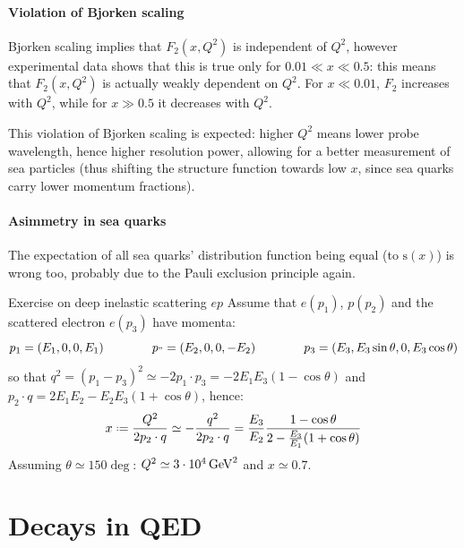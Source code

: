 \paragraph{Violation of Bjorken scaling}

Bjorken scaling implies that $ F_2(x,Q^2) $ is independent of $ Q^2 $, however experimental data shows that this is true only for $ 0.01 \ll x \ll 0.5 $: this means that $ F_2(x,Q^2) $ is actually weakly dependent on $ Q^2 $. For $ x \ll 0.01 $, $ F_2 $ increases with $ Q^2 $, while for $ x \gg 0.5 $ it decreases with $ Q^2 $.

This violation of Bjorken scaling is expected: higher $ Q^2 $ means lower probe wavelength, hence higher resolution power, allowing for a better measurement of sea particles (thus shifting the structure function towards low $ x $, since sea quarks carry lower momentum fractions).

\paragraph{Asimmetry in sea quarks}

The expectation of all sea quarks' distribution function being equal (to $ \text{s}(x) $) is wrong too, probably due to the Pauli exclusion principle again.

\begin{example}{Exercise on deep inelastic scattering $ ep $}{}
  Assume that $ e(p_1) $, $ p(p_2) $ and the scattered electron $ e(p_3) $ have momenta:
  \begin{equation*}
    p_1 = (E_1 , 0 , 0 , E_1)
    \qquad \qquad
    p_" = (E_2 , 0 , 0 , - E_2)
    \qquad \qquad
    p_3 = (E_3 , E_3 \sin \theta , 0 , E_3 \cos \theta)
  \end{equation*}
  so that $ q^2 = (p_1 - p_3)^2 \simeq - 2 p_1 \cdot p_3 = - 2 E_1 E_3 (1 - \cos \theta) $ and $ p_2 \cdot q = 2 E_1 E_2 - E_2 E_3 (1 + \cos \theta) $, hence:
  \begin{equation*}
    x \defeq \frac{Q^2}{2 p_2 \cdot q} \simeq - \frac{q^2}{2 p_2 \cdot q} = \frac{E_3}{E_2} \frac{1 - \cos \theta}{2 - \frac{E_3}{E_1} (1 + \cos \theta)}
  \end{equation*}
  Assuming $ \theta \simeq 150\deg $: $ Q^2 \simeq 3 \cdot 10^4 \,\mathrm{GeV}^2 $ and $ x \simeq 0.7 $.
\end{example}

\section{Decays in QED}

